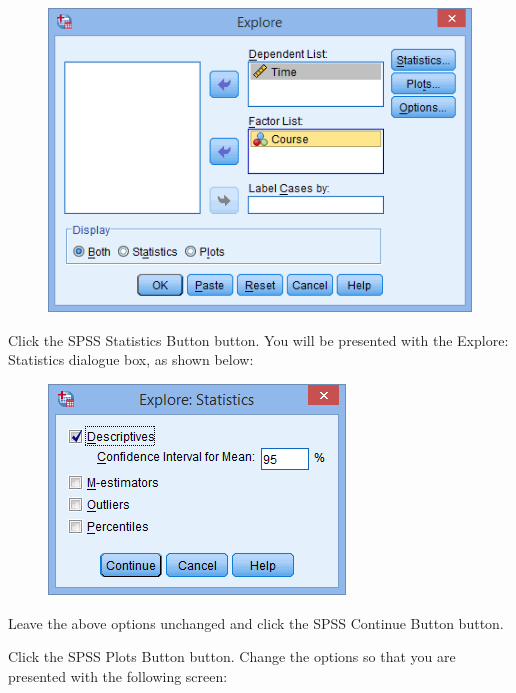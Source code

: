 \documentclass[]{article}
\begin{document}
\begin{figure}
	\centering
	\includegraphics[width=0.7\linewidth]{Normality/normality-4}
	\caption{}
	\label{fig:normality-4}
\end{figure}
Click the SPSS Statistics Button button. You will be presented with the Explore: Statistics dialogue box, as shown below:

\begin{figure}
	\centering
	\includegraphics[width=0.7\linewidth]{Normality/normality-5}
	\caption{}
	\label{fig:normality-5}
\end{figure}
Leave the above options unchanged and click the SPSS Continue Button button.

Click the SPSS Plots Button button. Change the options so that you are presented with the following screen:
\end{document}
